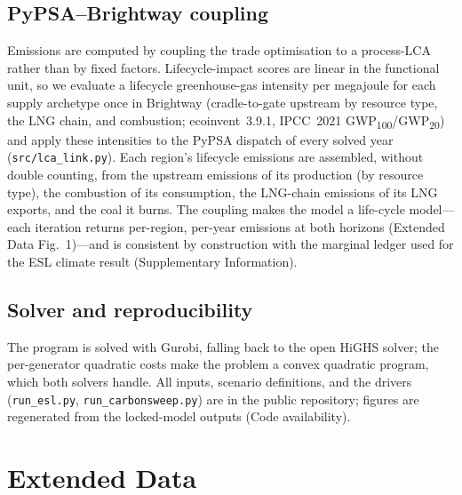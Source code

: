 \documentclass[sn-nature]{sn-jnl}
\theoremstyle{thmstyleone}%
\theoremstyle{thmstyletwo}%
\theoremstyle{thmstylethree}%
\begin{document}
\subsection*{PyPSA--Brightway coupling}
Emissions are computed by coupling the trade optimisation to a process-LCA
rather than by fixed factors. Lifecycle-impact scores are linear in the
functional unit, so we evaluate a lifecycle greenhouse-gas intensity per
megajoule for each supply archetype once in Brightway (cradle-to-gate upstream
by resource type, the LNG chain, and combustion; ecoinvent~3.9.1, IPCC~2021
GWP\textsubscript{100}/GWP\textsubscript{20}) and apply these intensities to
the PyPSA dispatch of every solved year (\texttt{src/lca\_link.py}). Each
region's lifecycle emissions are assembled, without double counting, from the
upstream emissions of its production (by resource type), the combustion of its
consumption, the LNG-chain emissions of its LNG exports, and the coal it burns.
The coupling makes the model a life-cycle model---each iteration returns
per-region, per-year emissions at both horizons (Extended Data Fig.~1)---and
is consistent by construction with the marginal ledger used for the ESL climate
result (Supplementary Information).

\subsection*{Solver and reproducibility}
The program is solved with Gurobi, falling back to the open HiGHS solver;
the per-generator quadratic costs make the problem a convex quadratic program,
which both solvers handle. All inputs, scenario definitions, and the drivers
(\texttt{run\_esl.py}, \texttt{run\_carbonsweep.py}) are in the public
repository; figures are regenerated from the locked-model outputs
(Code availability).

\clearpage
\section*{Extended Data}
\setcounter{figure}{0}
\renewcommand{\figurename}{Extended Data Fig.}
\end{document}

